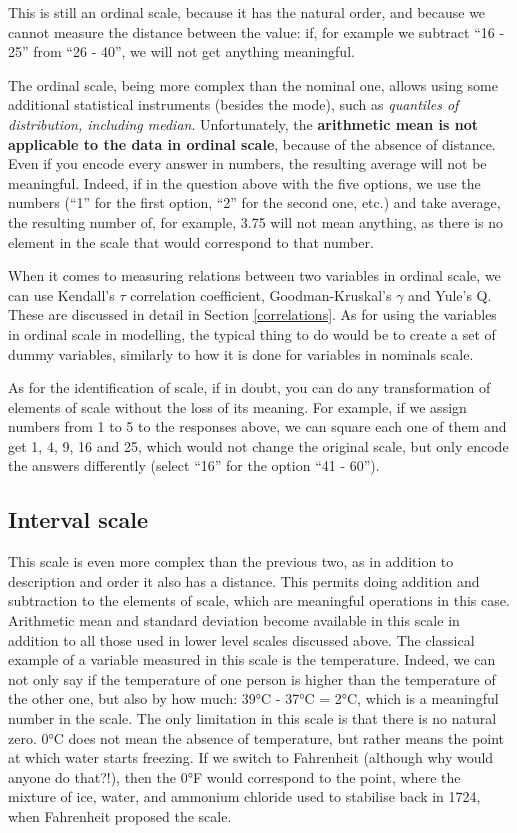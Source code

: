 \documentclass[
]{book}
\theoremstyle{definition}
\theoremstyle{definition}
\theoremstyle{definition}
\theoremstyle{definition}
\theoremstyle{remark}
\begin{document}
This is still an ordinal scale, because it has the natural order, and because we cannot measure the distance between the value: if, for example we subtract ``16 - 25'' from ``26 - 40'', we will not get anything meaningful.

The ordinal scale, being more complex than the nominal one, allows using some additional statistical instruments (besides the mode), such as \emph{quantiles of distribution, including median}. Unfortunately, the \textbf{arithmetic mean is not applicable to the data in ordinal scale}, because of the absence of distance. Even if you encode every answer in numbers, the resulting average will not be meaningful. Indeed, if in the question above with the five options, we use the numbers (``1'' for the first option, ``2'' for the second one, etc.) and take average, the resulting number of, for example, 3.75 will not mean anything, as there is no element in the scale that would correspond to that number.

When it comes to measuring relations between two variables in ordinal scale, we can use Kendall's \(\tau\) correlation coefficient, Goodman-Kruskal's \(\gamma\) and Yule's Q. These are discussed in detail in Section \ref{correlations}. As for using the variables in ordinal scale in modelling, the typical thing to do would be to create a set of dummy variables, similarly to how it is done for variables in nominals scale.

As for the identification of scale, if in doubt, you can do any transformation of elements of scale without the loss of its meaning. For example, if we assign numbers from 1 to 5 to the responses above, we can square each one of them and get 1, 4, 9, 16 and 25, which would not change the original scale, but only encode the answers differently (select ``16'' for the option ``41 - 60'').

\subsection{Interval scale}\label{interval-scale}

This scale is even more complex than the previous two, as in addition to description and order it also has a distance. This permits doing addition and subtraction to the elements of scale, which are meaningful operations in this case. Arithmetic mean and standard deviation become available in this scale in addition to all those used in lower level scales discussed above. The classical example of a variable measured in this scale is the temperature. Indeed, we can not only say if the temperature of one person is higher than the temperature of the other one, but also by how much: 39°C - 37°C = 2°C, which is a meaningful number in the scale. The only limitation in this scale is that there is no natural zero. 0°C does not mean the absence of temperature, but rather means the point at which water starts freezing. If we switch to Fahrenheit (although why would anyone do that?!), then the 0°F would correspond to the point, where the mixture of ice, water, and ammonium chloride used to stabilise back in 1724, when Fahrenheit proposed the scale.
\end{document}

